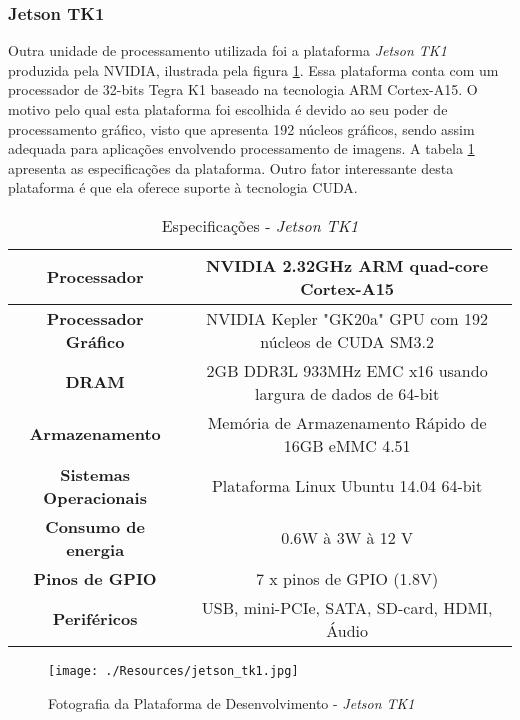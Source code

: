 \subsubsection{Jetson TK1}

Outra unidade de processamento utilizada foi a plataforma \textit{Jetson TK1} produzida pela NVIDIA, ilustrada pela figura \ref{jetson_tk1}. Essa plataforma conta com um processador de 32-bits Tegra K1 baseado na tecnologia ARM Cortex-A15. O motivo pelo qual esta plataforma foi escolhida é devido ao seu poder de processamento gráfico, visto que apresenta 192 núcleos gráficos, sendo assim adequada para aplicações envolvendo processamento de imagens. A tabela \ref{jetson_tk1_tab} apresenta as especificações da plataforma. Outro fator interessante desta plataforma é que ela oferece suporte à tecnologia CUDA.

\begin{table}[]
\centering
\caption{Especificações - \textit{Jetson TK1}}
\label{jetson_tk1_tab}
\begin{tabular}{|c|c|}
\hline
\textbf{Processador}           & NVIDIA 2.32GHz ARM quad-core Cortex-A15			\\	\hline
\textbf{Processador Gráfico}   & NVIDIA Kepler "GK20a" GPU com 192 núcleos de CUDA SM3.2	\\	\hline
\textbf{DRAM}                  & 2GB DDR3L 933MHz EMC x16 usando largura de dados de 64-bit	\\	\hline
\textbf{Armazenamento}         & Memória de Armazenamento Rápido de 16GB eMMC 4.51		\\	\hline
\textbf{Sistemas Operacionais} & Plataforma Linux Ubuntu 14.04 64-bit                  		\\	\hline
\textbf{Consumo de energia}    & 0.6W à 3W à 12 V                    		\\	\hline
\textbf{Pinos de GPIO}         & 7 x pinos de GPIO (1.8V)                              		\\	\hline
\textbf{Periféricos}           & USB, mini-PCIe, SATA, SD-card, HDMI, Áudio           		\\	\hline
\end{tabular}
\end{table}

\begin{figure}[H]
	\centering
	\texttt{[image: ./Resources/jetson\_tk1.jpg]}
	\caption{Fotografia da Plataforma de Desenvolvimento - \textit{Jetson TK1}}
	\label{jetson_tk1}
\end{figure}


